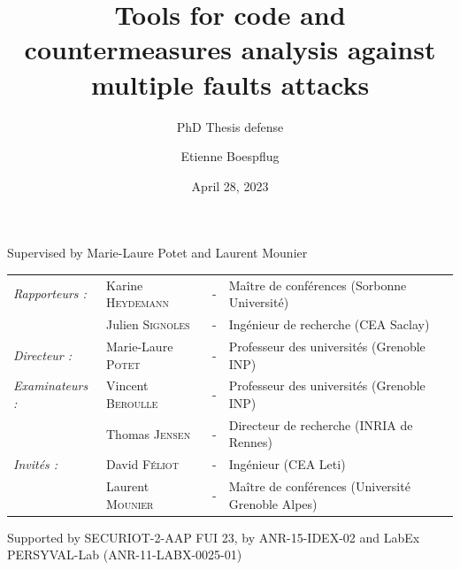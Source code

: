 \documentclass[xcolor=table,usenames,dvipsnames]{lib/bredelebeamer}
\title[PhD Thesis defense]{Tools for code and countermeasures analysis against multiple faults attacks}
\subtitle{PhD Thesis defense}
\author[Etienne Boespflug]{Etienne Boespflug}
\date{April 28, 2023}
\begin{document}
\begin{frame}
    \titlepage
    \begin{center}
        {\small Supervised by Marie-Laure Potet and Laurent Mounier}
    \end{center}
    
    \vspace{0.1cm}
    
    \begin{center}
        \noindent \tiny 
        \begin{tabular}{llcl}
            \textit{Rapporteurs :}	& Karine \textsc{Heydemann}		& - & Maître de conférences (Sorbonne Université)\\
                    & Julien \textsc{Signoles}		& - & Ingénieur de recherche (CEA Saclay)\\
            \textit{Directeur :}	& Marie-Laure \textsc{Potet}		& - & Professeur des universités (Grenoble INP)\\
            \textit{Examinateurs :}   & Vincent \textsc{Beroulle}          & - & Professeur des universités (Grenoble INP)\\
                        & Thomas \textsc{Jensen}			& - & Directeur de recherche (INRIA de Rennes)\\
            \textit{Invités :}		& David \textsc{Féliot}		& - & Ingénieur (CEA Leti)\\
                        & Laurent \textsc{Mounier}		& - & Maître de conférences (Université Grenoble Alpes)\\
        \end{tabular}
        \vfill
        {\tiny Supported by SECURIOT-2-AAP FUI 23, by ANR-15-IDEX-02 and LabEx PERSYVAL-Lab (ANR-11-LABX-0025-01)}
    \end{center}

\end{frame}



\end{document}
